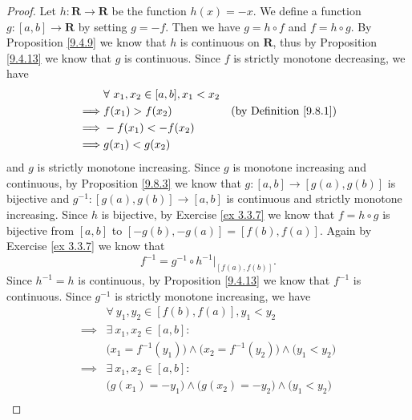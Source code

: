 \begin{proof}
    Let \(h : \mathbf{R} \to \mathbf{R}\) be the function \(h(x) = -x\).
    We define a function \(g : [a, b] \to \mathbf{R}\) by setting \(g = -f\).
    Then we have \(g = h \circ f\) and \(f = h \circ g\).
    By Proposition \ref{9.4.9} we know that \(h\) is continuous on \(\mathbf{R}\), thus by Proposition \ref{9.4.13} we know that \(g\) is continuous.
    Since \(f\) is strictly monotone decreasing, we have
    \begin{align*}
                 & \forall\ x_1, x_2 \in [a, b], x_1 < x_2                                      \\
        \implies & f(x_1) > f(x_2)                         & \text{(by Definition \ref{9.8.1})} \\
        \implies & -f(x_1) < -f(x_2)                                                            \\
        \implies & g(x_1) < g(x_2)
    \end{align*}
    and \(g\) is strictly monotone increasing.
    Since \(g\) is monotone increasing and continuous, by Proposition \ref{9.8.3} we know that \(g : [a, b] \to [g(a), g(b)]\) is bijective and \(g^{-1} : [g(a), g(b)] \to [a, b]\) is continuous and strictly monotone increasing.
    Since \(h\) is bijective, by Exercise \ref{ex 3.3.7} we know that \(f = h \circ g\) is bijective from \([a, b]\) to \([-g(b), -g(a)] = [f(b), f(a)]\).
    Again by Exercise \ref{ex 3.3.7} we know that
    \[
        f^{-1} = g^{-1} \circ h^{-1}|_{[f(a), f(b)]}.
    \]
    Since \(h^{-1} = h\) is continuous, by Proposition \ref{9.4.13} we know that \(f^{-1}\) is continuous.
    Since \(g^{-1}\) is strictly monotone increasing, we have
    \begin{align*}
                 & \forall\ y_1, y_2 \in [f(b), f(a)], y_1 < y_2                                                                                \\
        \implies & \exists\ x_1, x_2 \in [a, b] :                                                                                               \\
                 & \big(x_1 = f^{-1}(y_1)\big) \land \big(x_2 = f^{-1}(y_2)\big) \land \big(y_1 < y_2\big)                                      \\
        \implies & \exists\ x_1, x_2 \in [a, b] :                                                                                               \\
                 & \big(g(x_1) = -y_1\big) \land \big(g(x_2) = -y_2\big) \land \big(y_1 < y_2\big)                                              \\

\end{align*}
\end{proof}
